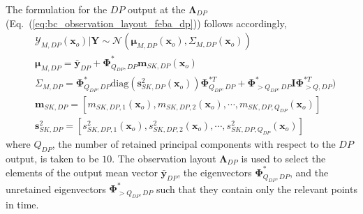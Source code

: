 The formulation for the $DP$ output at the $\boldsymbol{\Lambda}_{DP}$ (Eq.~(\ref{eq:bc_observation_layout_feba_dp})) follows accordingly,
\begin{equation}
	\begin{split}
		& \bm{\mathcal{Y}}_{M,DP} (\bm{x}_o) | \mathbf{Y} \sim \mathcal{N} (\boldsymbol{\mu}_{M,DP} (\bm{x}_o), \Sigma_{M,DP} (\bm{x}_o)) \\
		& \boldsymbol{\mu}_{M,DP}  = \bar{\mathbf{y}}_{DP} + \boldsymbol{\Phi}^*_{Q_{DP},DP} \mathbf{m}_{SK,DP}(\bm{x}_o) \\
		& \Sigma_{M,DP} = \boldsymbol{\Phi}^*_{Q_{DP},DP} \text{diag}(\mathbf{s}^2_{SK,DP}(\bm{x}_o)) \boldsymbol{\Phi}^{*T}_{Q_{DP},DP} + \boldsymbol{\Phi}^*_{>Q_{DP},DP} \mathbf{I}\boldsymbol{\Phi}^{*T}_{>Q,DP}) \\
		& \mathbf{m}_{SK,DP} = [m_{SK,DP,1}(\bm{x}_o), m_{SK,DP,2}(\bm{x}_o), \cdots, m_{SK,DP,Q_{DP}}(\bm{x}_o)] \\
		& \mathbf{s}^2_{SK,DP} = [s^2_{SK,DP,1}(\bm{x}_o), s^2_{SK,DP,2}(\bm{x}_o), \cdots, s^2_{SK,DP,Q_{DP}}(\bm{x}_o)]
	\end{split}
\label{eq:p_variate_metamodel_dp}
\end{equation}
where $Q_{DP}$, the number of retained principal components with respect to the $DP$ output, is taken to be $10$.
The observation layout $\boldsymbol{\Lambda}_{DP}$ is used to select the elements of the output mean vector $\bar{\mathbf{y}}_{DP}$, the eigenvectors $\boldsymbol{\Phi}^*_{Q_{DP},DP}$, and the unretained eigenvectors $\boldsymbol{\Phi}^*_{>Q_{DP},DP}$ such that they contain only the relevant points in time.

